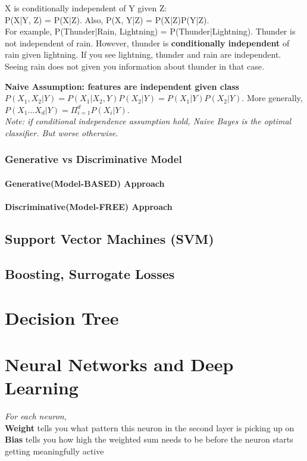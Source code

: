 \documentclass{article}
\begin{document}
X is conditionally independent of Y given Z:\\
P(X|Y, Z) = P(X|Z). Also, P(X, Y|Z) = P(X|Z)P(Y|Z).\\
For example, P(Thunder|Rain, Lightning) = P(Thunder|Lightning). Thunder is not independent of rain. However, thunder is \textbf{conditionally independent} of rain given lightning. If you see lightning, thunder and rain are independent. Seeing rain does not given you information about thunder in that case.

\textbf{Naive Assumption: features are independent given class}\\
$P(X_1, X_2|Y) = P(X_1|X_2, Y)P(X_2|Y) = P(X_1|Y)P(X_2|Y)$. More generally, $P(X_1...X_d|Y) = \Pi_{i=1}^{d} P(X_i|Y)$.\\
\textit{Note: if conditional independence assumption hold, Naive Bayes is the optimal classifier. But worse otherwise.}

\subsubsection{Generative vs Discriminative Model}
\paragraph{Generative(Model-BASED) Approach}

\paragraph{Discriminative(Model-FREE) Approach}

\subsection{Support Vector Machines (SVM)}
\subsection{Boosting, Surrogate Losses}

\section{Decision Tree}

\newpage
\section{Neural Networks and Deep Learning}
\textit{For each neuron, }\\
\textbf{Weight} tells you what pattern this neuron in the second layer is picking up on 
\textbf{Bias} tells you how high the weighted sum needs to be before the neuron starts getting meaningfully active
\end{document}
